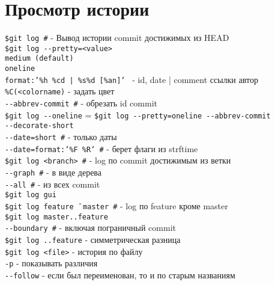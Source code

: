 \section{Просмотр истории}

\noindent \texttt{\$git log \indent\#} - Вывод истории commit достижимых из HEAD \\
\noindent \texttt{\$git log {-}-pretty=<value>} \\
\indent \texttt{medium (default)} \\
\indent\texttt{oneline} \\
\indent\texttt{format:'\%h \%cd | \%s\%d [\%an]' }  - id, date | comment ссылки автор \\
\indent\indent\texttt{\%C(<colorname)\indent} - задать цвет \\


\indent \texttt{{-}-abbrev-commit \indent\#} - обрезать id commit \\
\noindent \texttt{\$git log {-}-oneline}  = \texttt{\$git log {-}-pretty=oneline {-}-abbrev-commit} \\
\indent \texttt{{-}-decorate-short} \\
\indent \texttt{{-}-date=short \indent\#} - только даты \\
\indent \texttt{{-}-date=format:'\%F \%R' \indent\#}  - берет флаги из strftime \\

\noindent \texttt{\$git log <branch> \indent\#}  - log по commit достижимым из ветки \\
\indent \texttt{{-}-graph \indent\#} - в виде дерева \\
\indent \texttt{{-}-all \indent\#} - из всех commit \\

\noindent \texttt{\$git log gui} \\
\noindent \texttt{\$git log feature {$ \mathbin{\char`\^} $}master \indent\#} - log по feature кроме master \\
\noindent \texttt{\$git log master..feature} \\
\indent \texttt{{-}-boundary \indent\#} - включая пограничный commit \\


\noindent \texttt{\$git log ..feature} - симметрическая разница \\

\noindent \texttt{\$git log <file>} - история по файлу \\
\indent \texttt{-p} - показывать различия \\
\indent \texttt{{-}-follow} - если был переименован, то и по старым названиям \\

